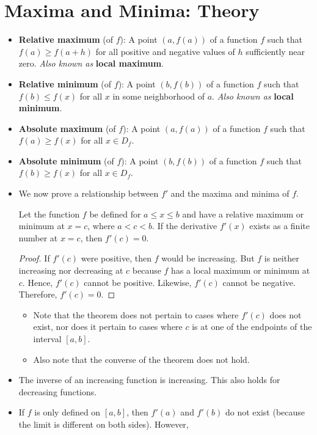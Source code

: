 \documentclass[../main.tex]{subfiles}
\begin{document}
\section{Maxima and Minima: Theory}
\begin{itemize}
    \item \textbf{Relative maximum} (of $f$): A point $(a,f(a))$ of a function $f$ such that $f(a)\geq f(a+h)$ for all positive and negative values of $h$ sufficiently near zero. \emph{Also known as} \textbf{local maximum}.
    \item \textbf{Relative minimum} (of $f$): A point $(b,f(b))$ of a function $f$ such that $f(b)\leq f(x)$ for all $x$ in some neighborhood of $a$. \emph{Also known as} \textbf{local minimum}.
    \item \textbf{Absolute maximum} (of $f$): A point $(a,f(a))$ of a function $f$ such that $f(a)\geq f(x)$ for all $x\in D_f$.
    \item \textbf{Absolute minimum} (of $f$): A point $(b,f(b))$ of a function $f$ such that $f(b)\geq f(x)$ for all $x\in D_f$.
    \item We now prove a relationship between $f'$ and the maxima and minima of $f$.
    \begin{thm}\label{thm:f'is0atextrema}
        Let the function $f$ be defined for $a\leq x\leq b$ and have a relative maximum or minimum at $x=c$, where $a<c<b$. If the derivative $f'(x)$ exists as a finite number at $x=c$, then $f'(c)=0$.
        \begin{proof}
            If $f'(c)$ were positive, then $f$ would be increasing. But $f$ is neither increasing nor decreasing at $c$ because $f$ has a local maximum or minimum at $c$. Hence, $f'(c)$ cannot be positive. Likewise, $f'(c)$ cannot be negative. Therefore, $f'(c)=0$.
        \end{proof}
    \end{thm}
    \begin{itemize}
        \item Note that the theorem does not pertain to cases where $f'(c)$ does not exist, nor does it pertain to cases where $c$ is at one of the endpoints of the interval $[a,b]$.
        \item Also note that the converse of the theorem does not hold.
    \end{itemize}
    \item The inverse of an increasing function is increasing. This also holds for decreasing functions.
    \item If $f$ is only defined on $[a,b]$, then $f'(a)$ and $f'(b)$ do not exist (because the limit is different on both sides). However,

\end{itemize}
\end{document}

